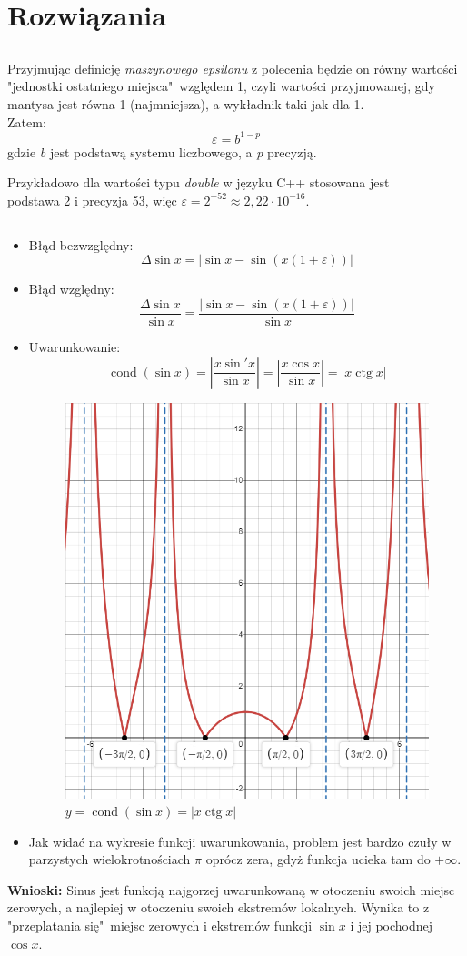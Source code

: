 \documentclass{article}
\DeclareMathOperator{\cond}{cond}
\DeclareMathOperator{\ctg}{ctg}
\begin{document}
\section{Rozwiązania}

\subsection{}
Przyjmując definicję \textit{maszynowego epsilonu} z polecenia będzie on równy wartości "jednostki ostatniego miejsca"\ względem 1, czyli wartości przyjmowanej, gdy mantysa jest równa 1 (najmniejsza), a wykładnik taki jak dla 1.\\
Zatem:
\[\varepsilon = b^{1 - p}\]
gdzie \textit{b} jest podstawą systemu liczbowego, a \textit{p} precyzją.

\vspace{3mm}
\noindent
Przykładowo dla wartości typu \textit{double} w języku C++ stosowana jest\\
podstawa 2 i precyzja 53, więc \(\varepsilon = 2^{-52} \approx 2,22 \cdot 10^{-16}\).

\subsection{}
\begin{itemize}
    \item Błąd bezwzględny:
    \[\Delta \sin x = |\sin x - \sin(x(1 + \varepsilon))|\]
    \item Błąd względny:
    \[\frac{\Delta \sin x}{\sin x} = \frac{|\sin x - \sin(x(1 + \varepsilon))|}{\sin x}\]
    \item Uwarunkowanie:
    \[\cond (\sin x) = \left|\frac{x \sin'x}{\sin x}\right| = \left|\frac{x \cos x}{\sin x}\right| = |x \ctg x|\]
    \begin{figure}[H]
        \centering
        \includegraphics[width=0.5\linewidth]{wykres.png}
        \caption{\(y = \cond(\sin x) = |x \ctg x|\)}
        \label{fig:graph1}
    \end{figure}
    \item Jak widać na wykresie funkcji uwarunkowania, problem jest bardzo czuły w parzystych wielokrotnościach \(\pi\) oprócz zera, gdyż funkcja ucieka tam do \(+\infty\).
\end{itemize}
\textbf{Wnioski:} Sinus jest funkcją najgorzej uwarunkowaną w otoczeniu swoich miejsc zerowych, a najlepiej w otoczeniu swoich ekstremów lokalnych. Wynika to z "przeplatania się"\ miejsc zerowych i ekstremów funkcji \(\sin x\) i jej pochodnej \(\cos x\).
\end{document}

